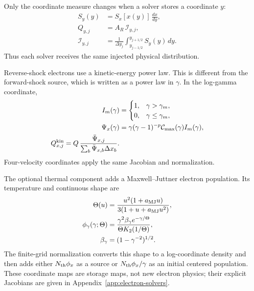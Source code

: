 \documentclass[twocolumn]{aastex702}
\begin{document}
Only the coordinate measure changes when a solver stores a coordinate \(y\):
\begin{equation}
\begin{aligned}
S_y(y)&=S_x[x(y)]\,\frac{dx}{dy},\\
Q_{y,j}
&=A_R\,\mathcal I_{y,j},\\
\mathcal I_{y,j}
&=\frac{1}{\Delta y_j}
\int_{y_{j-1/2}}^{y_{j+1/2}}
S_y(y)\,dy .
\end{aligned}
\end{equation}
Thus each solver receives the same injected physical distribution.

Reverse-shock electrons use a kinetic-energy power law.  This is different from
the forward-shock source, which is written as a power law in \(\gamma\).  In the
log-gamma coordinate,
\begin{equation}
\begin{aligned}
I_m(\gamma)&=
\begin{cases}
1, & \gamma>\gamma_m,\\
0, & \gamma\le\gamma_m,
\end{cases}\\
\Psi_x(\gamma)&=\gamma(\gamma-1)^{-p}
\mathcal{C}_{\max}(\gamma)I_m(\gamma),\\
Q_{x,j}^{\rm kin}=Q\,
\frac{\bar\Psi_{x,j}}
{\sum_b \bar\Psi_{x,b}\Delta x_b}.
\end{aligned}
\end{equation}
Four-velocity coordinates apply the same Jacobian and normalization.

The optional thermal component adds a Maxwell--Juttner electron population.  Its
temperature and continuous shape are
\begin{equation}
\begin{aligned}
\Theta(u)&=
\frac{u^2(1+a_{\rm MJ}u)}{3(1+u+a_{\rm MJ}u^2)},\\
\phi_\gamma(\gamma;\Theta)&=
\frac{\gamma^2\beta_\gamma e^{-\gamma/\Theta}}
{\Theta K_2(1/\Theta)},
\\
\beta_\gamma&=(1-\gamma^{-2})^{1/2}.
\end{aligned}
\end{equation}
The finite-grid normalization converts this shape to a log-coordinate density and
then adds either \(N_{\rm th}\phi_x\) as a source or \(N_{\rm th}\phi_x/\gamma\)
as an initial centered population.  These coordinate maps are storage maps, not
new electron physics; their explicit Jacobians are given in
Appendix~\ref{app:electron-solvers}.
\end{document}
